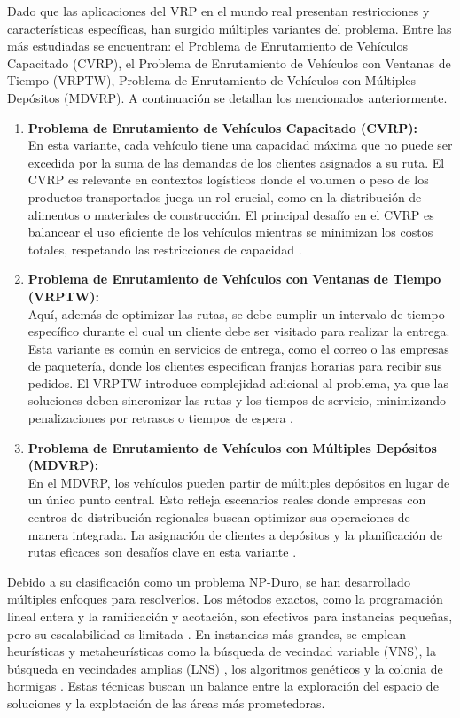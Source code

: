 \documentclass{article}
\begin{document}
Dado que las aplicaciones del VRP en el mundo real presentan restricciones y características específicas, han surgido múltiples variantes del problema. Entre las más estudiadas se encuentran: el Problema de Enrutamiento de Vehículos Capacitado (CVRP), el Problema de Enrutamiento de Vehículos con Ventanas de Tiempo (VRPTW), Problema de Enrutamiento de Vehículos con Múltiples Depósitos (MDVRP). A continuación se detallan los mencionados anteriormente.
\begin{enumerate}
\item
\textbf{Problema de Enrutamiento de Vehículos Capacitado (CVRP):}\\
En esta variante, cada vehículo tiene una capacidad máxima que no puede ser excedida por la suma de las demandas de los clientes asignados a su ruta. El CVRP es relevante en contextos logísticos donde el volumen o peso de los productos transportados juega un rol crucial, como en la distribución de alimentos o materiales de construcción. El principal desafío en el CVRP es balancear el uso eficiente de los vehículos mientras se minimizan los costos totales, respetando las restricciones de capacidad \cite{ref6}. 

\item
\textbf{Problema de Enrutamiento de Vehículos con Ventanas de Tiempo (VRPTW):}\\
Aquí, además de optimizar las rutas, se debe cumplir un intervalo de tiempo específico durante el cual un cliente debe ser visitado para realizar la entrega. Esta variante es común en servicios de entrega, como el correo o las empresas de paquetería, donde los clientes especifican franjas horarias para recibir sus pedidos. El VRPTW introduce complejidad adicional al problema, ya que las soluciones deben sincronizar las rutas y los tiempos de servicio, minimizando penalizaciones por retrasos o tiempos de espera \cite{ref9}.

\item
\textbf{Problema de Enrutamiento de Vehículos con Múltiples Depósitos (MDVRP):}\\
En el MDVRP, los vehículos pueden partir de múltiples depósitos en lugar de un único punto central. Esto refleja escenarios reales donde empresas con centros de distribución regionales buscan optimizar sus operaciones de manera integrada. La asignación de clientes a depósitos y la planificación de rutas eficaces son desafíos clave en esta variante \cite{ref1}.
\end{enumerate}

Debido a su clasificación como un problema NP-Duro, se han desarrollado múltiples enfoques para resolverlos. Los métodos exactos, como la programación lineal entera y la ramificación y acotación, son efectivos para instancias pequeñas, pero su escalabilidad es limitada \cite{ref5}. En instancias más grandes, se emplean heurísticas y metaheurísticas como la búsqueda de vecindad variable (VNS), la búsqueda en vecindades amplias (LNS) \cite{ref4}, los algoritmos genéticos y la colonia de hormigas \cite{ref7}. Estas técnicas buscan un balance entre la exploración del espacio de soluciones y la explotación de las áreas más prometedoras.
\end{document}
